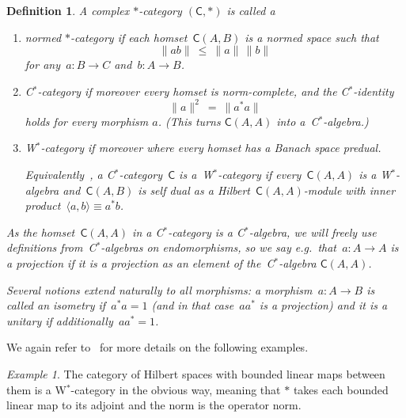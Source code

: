 \documentclass[reqno,T1,11pt]{amsproc}
\newcommand{\cat}[1]{\mathsf{#1}}		%
\theoremstyle{plain}
\newtheorem{defn}[thm]{Definition}
\theoremstyle{remark}
\newtheorem{ex}[thm]{Example}
\numberwithin{equation}{section}
\begin{document}
\begin{defn}
A complex $*$-category $(\cat{C},*)$ is called a
\begin{enumerate}
	\item \emph{normed $*$-category} if each homset~$\cat{C}(A,B)$ is a normed space such that
	    \[
		    \| ab \| \ \leq\  \|a\| \, \|b\|
	    \]
                for any~$a\colon B \to C$ and~$b\colon A \to B$.
	\item\label{Cstarcat}
    \emph{C$^*$-category} if moreover every homset is norm-complete, and the C$^*$-identity
    \[
	\|a \|^2\  =\  \|a^*a\|
     \]
	holds for every morphism $a$.
        (This turns $\cat{C}(A,A)$ into a~C$^*$-algebra.)
\item\label{Wstarcat}
    \emph{W$^*$-category} if moreover
        where every homset has a Banach space predual.
        
	Equivalently~\cite[Prop.~2.15]{wstarcat}, a C$^*$-category~$\cat{C}$
            is a~W$^*$-category
            if every~$\cat{C}(A,A)$ is a W$^*$-algebra
            and~$\cat{C}(A,B)$ is self dual
            as a Hilbert~$\cat{C}(A,A)$-module
            with inner product~$\langle a,b\rangle \equiv a^*b$.
\end{enumerate}
As the homset~$\cat{C}(A,A)$
    in a C$^*$-category
    is a C$^*$-algebra,
    we will freely use definitions from~C$^*$-algebras on endomorphisms,
    so we say e.g.~that~$a\colon A \to A$ is a \emph{projection} if it is a projection as an element of the~C$^*$-algebra $\cat{C}(A,A)$.

Several notions extend naturally to all morphisms:
    a morphism~$a \colon A \to B$ is called an \emph{isometry} if~$a^*a=1$
        (and in that case~$aa^*$ is a projection)
        and it is a \emph{unitary} if additionally~$aa^*=1$.
\end{defn}


We again refer to~\cite{wstarcat} for more details on the following examples.

\begin{ex}
The category of Hilbert spaces with bounded linear maps between them
    is a W$^*$-category in the obvious way, meaning that $*$ takes each bounded linear map to its adjoint and the norm is the operator norm.
\end{ex}
\end{document}
